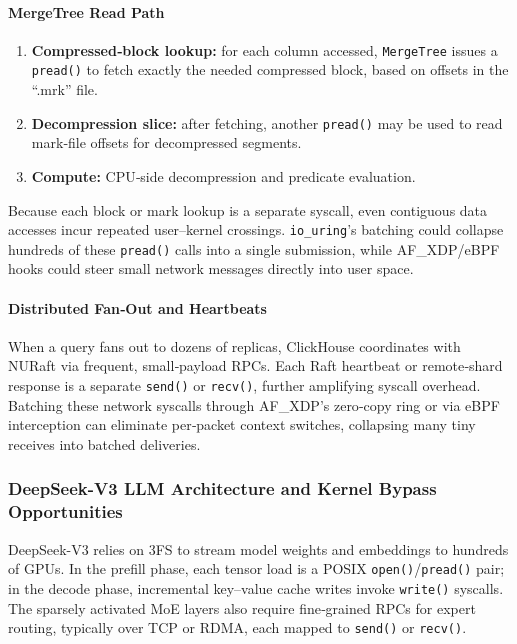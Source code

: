 \documentclass[sigconf,10pt]{acmart}
\begin{document}
\paragraph{MergeTree Read Path}  
\begin{enumerate}
  \item \textbf{Compressed‐block lookup:} for each column accessed, \texttt{MergeTree} issues a \texttt{pread()} to fetch exactly the needed compressed block, based on offsets in the “.mrk” file.
  \item \textbf{Decompression slice:} after fetching, another \texttt{pread()} may be used to read mark‐file offsets for decompressed segments.
  \item \textbf{Compute:} CPU‐side decompression and predicate evaluation.
\end{enumerate}  
Because each block or mark lookup is a separate syscall, even contiguous data accesses incur repeated user–kernel crossings.  \texttt{io\_uring}’s batching could collapse hundreds of these \texttt{pread()} calls into a single submission, while AF\_XDP/eBPF hooks could steer small network messages directly into user space.

\paragraph{Distributed Fan‐Out and Heartbeats}  
When a query fans out to dozens of replicas, ClickHouse coordinates with NURaft via frequent, small‐payload RPCs.  Each Raft heartbeat or remote‐shard response is a separate \texttt{send()} or \texttt{recv()}, further amplifying syscall overhead.  Batching these network syscalls through AF\_XDP’s zero‐copy ring or via eBPF interception can eliminate per‐packet context switches, collapsing many tiny receives into batched deliveries.

\subsubsection{DeepSeek-V3 LLM Architecture and Kernel Bypass Opportunities}  
DeepSeek-V3 relies on 3FS to stream model weights and embeddings to hundreds of GPUs.  In the prefill phase, each tensor load is a POSIX \texttt{open()}/\texttt{pread()} pair; in the decode phase, incremental key–value cache writes invoke \texttt{write()} syscalls.  The sparsely activated MoE layers also require fine‐grained RPCs for expert routing, typically over TCP or RDMA, each mapped to \texttt{send()} or \texttt{recv()}.
\end{document}
